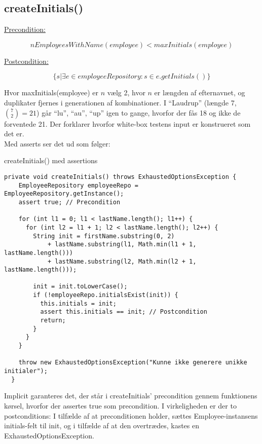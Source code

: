 \subsection{createInitials()} \label{sec:contract_create_initials}
\underline{Precondition:}
\vspace{4pt}

\begin{equation}
  nEmployeesWithName(employee) < maxInitials(employee)
\end{equation}
\vspace{4pt}

\noindent
\underline{Postcondition:}
\vspace{4pt}

\begin{equation}
  \{s | \exists e \in employeeRepository : s \in e.getInitials()\}
\end{equation}
\vspace{4pt}

\noindent
Hvor maxInitials(employee) er \(n\) vælg 2, hvor \(n\) er længden af efternavnet, og duplikater fjernes i generationen af kombinationer.\newline
I ``Laudrup'' (længde 7, \(\binom{7}{2} = 21\)) går ``lu'', ``au'', ``up'' igen to gange, hvorfor der fås 18 og ikke de forventede 21. Der forklarer hvorfor white-box testens input er konstrueret som det er.\\[4mm]
Med asserts ser det ud som følger:
\begin{listing}[H]
  \centering
  \caption{createInitials() med assertions}\label{lst:create_initials_assertions}
  \begin{verbatim}
private void createInitials() throws ExhaustedOptionsException {
    EmployeeRepository employeeRepo = EmployeeRepository.getInstance();
    assert true; // Precondition

    for (int l1 = 0; l1 < lastName.length(); l1++) {
      for (int l2 = l1 + 1; l2 < lastName.length(); l2++) {
        String init = firstName.substring(0, 2)
            + lastName.substring(l1, Math.min(l1 + 1, lastName.length()))
            + lastName.substring(l2, Math.min(l2 + 1, lastName.length()));

        init = init.toLowerCase();
        if (!employeeRepo.initialsExist(init)) {
          this.initials = init;
          assert this.initials == init; // Postcondition
          return;
        }
      }
    }

    throw new ExhaustedOptionsException("Kunne ikke generere unikke initialer");
  }
    \end{verbatim}
\end{listing}
Implicit garanteres det, der står i createInitials' precondition gennem funktionens kørsel, hvorfor der assertes true som precondition. I virkeligheden er der to postconditions: I tilfælde af at preconditionen holder, sættes Employee-instansens initials-felt til init, og i tilfælde af at den overtrædes, kastes en ExhaustedOptionsException.
